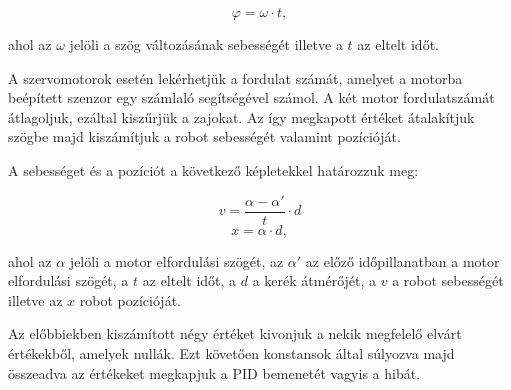 \begin{equation} \label{szog}
\varphi=\omega \cdot t,
\end{equation}

ahol az $\omega$ jelöli a szög változásának sebességét illetve a $t$ az eltelt időt.

A szervomotorok esetén lekérhetjük a fordulat számát, amelyet a motorba beépített szenzor egy számlaló segítségével számol. A két motor fordulatszámát átlagoljuk, ezáltal kiszűrjük a zajokat. Az így megkapott értéket átalakítjuk szögbe majd kiszámítjuk a robot sebességét valamint pozícióját.

A sebességet és a pozíciót a következő képletekkel határozzuk meg:

\begin{equation} \label{sebesseg}
	v=\frac{\alpha-\alpha'}{t}\cdot d
\end{equation}
\begin{equation} \label{pozicio}
	x=\alpha\cdot d,
\end{equation}

ahol az $\alpha$ jelöli a motor elfordulási szögét, az $\alpha'$ az előző időpillanatban a motor elfordulási szögét, a $t$ az eltelt időt, a $d$ a kerék átmérőjét, a $v$ a robot sebességét illetve az $x$ robot pozícióját.

Az előbbiekben kiszámított négy értéket kivonjuk a nekik megfelelő elvárt értékekből, amelyek nullák. Ezt követően konstansok által súlyozva majd összeadva az értékeket megkapjuk a PID bemenetét vagyis a hibát.